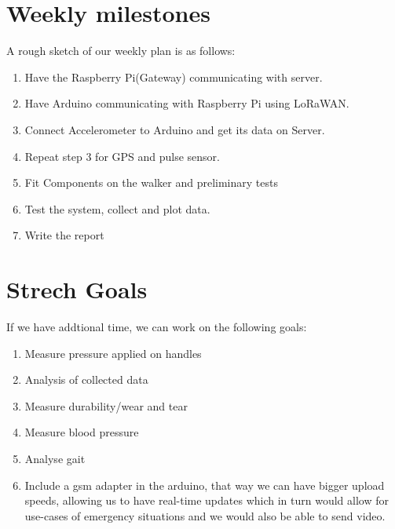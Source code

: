 \documentclass[conference]{IEEEtran}
\begin{document}
\section{Weekly milestones}
A rough sketch of our weekly plan is as follows:

\begin{enumerate}
	\item Have the Raspberry Pi(Gateway) communicating with server.
	\item Have Arduino communicating with Raspberry Pi using LoRaWAN.
	\item Connect Accelerometer to Arduino and get its data on Server.
	\item Repeat step 3 for GPS and pulse sensor.
	\item Fit Components on the walker and preliminary tests
	\item Test the system, collect and plot data.
	\item Write the report
\end{enumerate}

\section{Strech Goals}
If we have addtional time, we can work on the following goals:
\begin{enumerate}
	\item Measure pressure applied on handles
	\item Analysis of collected data
	\item Measure durability/wear and tear
	\item Measure blood pressure
	\item Analyse gait
	\item Include a gsm adapter in the arduino, that way we can have bigger upload speeds, allowing us to have real-time updates which in turn would allow for use-cases of emergency situations and we would also be able to send video.
\end{enumerate}

%

\end{document}
